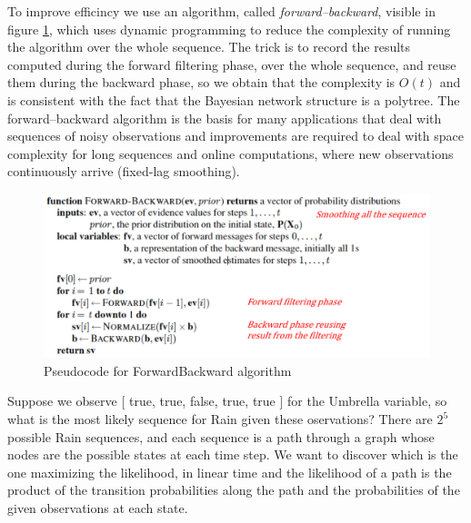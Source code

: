 To improve efficincy we use an algorithm, called \emph{forward–backward}, visible in figure
\ref{img:forwardBackward}, which uses dynamic programming to reduce the complexity
of running the algorithm over the whole sequence.\newline
The trick is to record the results computed during the forward filtering phase,
over the whole sequence, and reuse them during the backward phase, so we obtain that 
the complexity is $O(t)$ and is consistent with the fact that the 
Bayesian network structure is a polytree.\newline
The forward–backward algorithm is the basis for many applications that deal
with sequences of noisy observations and improvements are required to deal with
space complexity for long sequences and online computations, where new observations
continuously arrive (fixed-lag smoothing).

\begin{figure}
	\includegraphics[width=\textwidth]{Images/forwardBackward}
	\caption{Pseudocode for ForwardBackward algorithm}
	\label{img:forwardBackward}
\end{figure}
Suppose we observe [ true, true, false, true, true ] for the Umbrella variable, so 
what is the most likely sequence for Rain given these oservations?\newline
There are $2^5$ possible Rain sequences, and each sequence is a path through a graph
whose nodes are the possible states at each time step.\newline
We want to discover which is the one maximizing the likelihood, in linear time and the 
likelihood of a path is the product of the transition probabilities along the path and
the probabilities of the given observations at each state.

